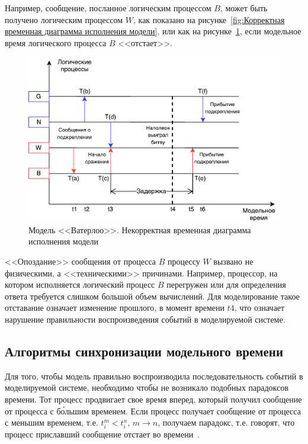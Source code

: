 Например, сообщение, посланное логическим процессом $B$, может быть получено логическим процессом $W$, как показано на рисунке~\ref{fig:Корректная временная диаграмма исполнения модели}, или как на рисунке~\ref{fig:Некорректная временная диаграмма исполнения модели}, если модельное время логического процесса $B$ <<отстает>>.

\begin{figure}[!ht]
\centering
\includegraphics[scale=1]{images/waterloo-kas.pdf}
\caption{Модель <<Ватерлоо>>. Некорректная временная диаграмма исполнения модели}
\label{fig:Некорректная временная диаграмма исполнения модели}
\end{figure}

<<Опоздание>> сообщения от процесса $B$  процессу $W$ вызвано не физическими, а <<техническими>> причинами. Например, процессор, на котором исполняется логический процесс $B$ перегружен или для определения ответа требуется слишком большой объем вычислений. Для моделирование такое отставание означает изменение прошлого, в момент времени $t4$, что означает нарушение правильности воспроизведения событий в моделируемой системе.

\subsection{Алгоритмы синхронизации модельного времени}

Для того, чтобы модель правильно воспроизводила последовательность событий в моделируемой системе, необходимо чтобы не возникало подобных парадоксов времени.
Тот процесс продвигает свое время вперед, который получил сообщение от процесса с б\'ольшим временем. Если процесс получает сообщение от процесса с меньшим временем, т.е. $t_i^m<t_i^n, \, m \to n$, получаем парадокс, т.е. говорят, что процесс приславший сообщение  отстает во времени~\cite{okol}.

